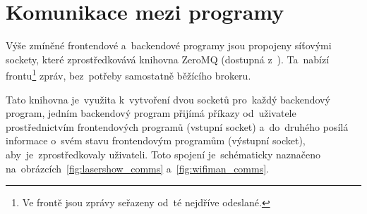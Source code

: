 \section{Komunikace mezi programy}\label{sec:comms}
Výše zmíněné frontendové  a~backendové programy jsou propojeny síťovými sockety, které zprostředkovává knihovna ZeroMQ (dostupná z~\cite{zeromq}). Ta~nabízí frontu\footnote{Ve frontě jsou zprávy seřazeny od~té nejdříve odeslané.} zpráv,  bez~potřeby samostatně běžícího brokeru.

Tato knihovna je~využita k~vytvoření dvou socketů  pro~každý backendový program, jedním backendový program přijímá příkazy od~uživatele prostřednictvím frontendových programů (vstupní socket) a~do~druhého posílá informace  o~svém stavu frontendovým programům (výstupní socket),  aby~je~zprostředkovaly uživateli. Toto spojení je~schématicky naznačeno na~obrázcích~\ref{fig:lasershow_comms} a~\ref{fig:wifiman_comms}.

